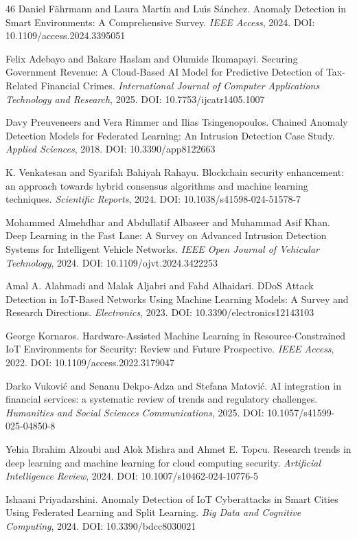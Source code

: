 \documentclass[3p,times,procedia]{elsarticle}
\begin{document}
\begin{thebibliography}{46}
Daniel Fährmann and Laura Martín and Luı́s Sánchez.
Anomaly Detection in Smart Environments: A Comprehensive Survey.
\textit{IEEE Access}, 2024.
DOI: 10.1109/access.2024.3395051

Felix Adebayo and Bakare Haslam and Olumide Ikumapayi.
Securing Government Revenue: A Cloud-Based AI Model for Predictive Detection of Tax-Related Financial Crimes.
\textit{International Journal of Computer Applications Technology and Research}, 2025.
DOI: 10.7753/ijcatr1405.1007

Davy Preuveneers and Vera Rimmer and Ilias Tsingenopoulos.
Chained Anomaly Detection Models for Federated Learning: An Intrusion Detection Case Study.
\textit{Applied Sciences}, 2018.
DOI: 10.3390/app8122663

K. Venkatesan and Syarifah Bahiyah Rahayu.
Blockchain security enhancement: an approach towards hybrid consensus algorithms and machine learning techniques.
\textit{Scientific Reports}, 2024.
DOI: 10.1038/s41598-024-51578-7

Mohammed Almehdhar and Abdullatif Albaseer and Muhammad Asif Khan.
Deep Learning in the Fast Lane: A Survey on Advanced Intrusion Detection Systems for Intelligent Vehicle Networks.
\textit{IEEE Open Journal of Vehicular Technology}, 2024.
DOI: 10.1109/ojvt.2024.3422253

Amal A. Alahmadi and Malak Aljabri and Fahd Alhaidari.
DDoS Attack Detection in IoT-Based Networks Using Machine Learning Models: A Survey and Research Directions.
\textit{Electronics}, 2023.
DOI: 10.3390/electronics12143103

George Kornaros.
Hardware-Assisted Machine Learning in Resource-Constrained IoT Environments for Security: Review and Future Prospective.
\textit{IEEE Access}, 2022.
DOI: 10.1109/access.2022.3179047

Darko Vuković and Senanu Dekpo-Adza and Stefana Matović.
AI integration in financial services: a systematic review of trends and regulatory challenges.
\textit{Humanities and Social Sciences Communications}, 2025.
DOI: 10.1057/s41599-025-04850-8

Yehia Ibrahim Alzoubi and Alok Mishra and Ahmet E. Topcu.
Research trends in deep learning and machine learning for cloud computing security.
\textit{Artificial Intelligence Review}, 2024.
DOI: 10.1007/s10462-024-10776-5

Ishaani Priyadarshini.
Anomaly Detection of IoT Cyberattacks in Smart Cities Using Federated Learning and Split Learning.
\textit{Big Data and Cognitive Computing}, 2024.
DOI: 10.3390/bdcc8030021


\end{thebibliography}
\end{document}
